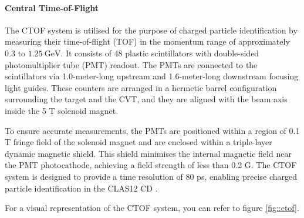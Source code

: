 \paragraph{Central Time-of-Flight}
\label{par::ctof}
    The CTOF system is utilised for the purpose of charged particle identification by measuring their time-of-flight (TOF) in the momentum range of approximately $0.3$ to $1.25 ~\text{GeV}$.
    It consists of 48 plastic scintillators with double-sided photomultiplier tube (PMT) readout.
    The PMTs are connected to the scintillators via 1.0-meter-long upstream and 1.6-meter-long downstream focusing light guides.
    These counters are arranged in a hermetic barrel configuration surrounding the target and the CVT, and they are aligned with the beam axis inside the 5 T solenoid magnet.

    To ensure accurate measurements, the PMTs are positioned within a region of 0.1 T fringe field of the solenoid magnet and are enclosed within a triple-layer dynamic magnetic shield.
    This shield minimises the internal magnetic field near the PMT photocathode, achieving a field strength of less than 0.2 G.
    The CTOF system is designed to provide a time resolution of 80 ps, enabling precise charged particle identification in the CLAS12 CD \cite{carman2020ctof}.

    For a visual representation of the CTOF system, you can refer to figure \ref{fig::ctof}.
